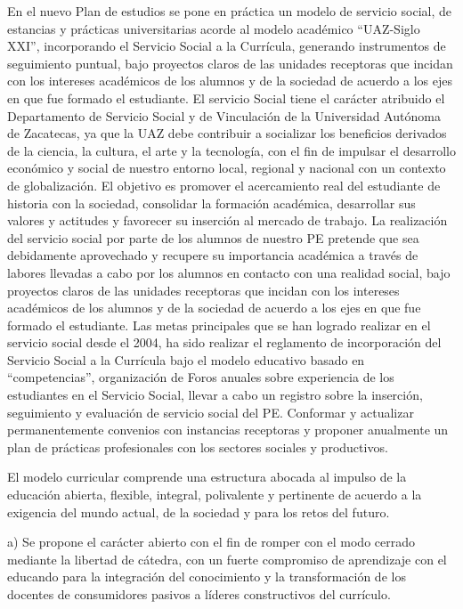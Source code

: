 En el nuevo Plan de estudios  se pone en práctica un modelo de servicio
social, de estancias y prácticas universitarias acorde al modelo académico
“UAZ-Siglo XXI”,  incorporando el Servicio Social a la Currícula, generando
instrumentos de seguimiento puntual, bajo proyectos claros de las unidades
receptoras que incidan con los intereses académicos de los alumnos y de la
sociedad de acuerdo a los ejes en que fue formado el estudiante.  El
servicio Social tiene el carácter atribuido el Departamento de Servicio
Social y de Vinculación de la Universidad Autónoma de Zacatecas, ya que la
UAZ debe contribuir a socializar los beneficios derivados de la ciencia, la
cultura, el arte y la tecnología, con el fin de impulsar el desarrollo
económico y social de nuestro entorno local, regional y nacional con un
contexto de globalización. El objetivo es promover el acercamiento real del
estudiante de historia con la sociedad, consolidar la formación académica,
desarrollar sus valores y actitudes y favorecer su inserción al mercado de
trabajo. La realización del servicio social por parte de los alumnos de
nuestro PE pretende que sea debidamente aprovechado y recupere su
importancia académica a través de labores llevadas a cabo por los alumnos
en contacto con una realidad social,  bajo proyectos claros de las unidades
receptoras que incidan con los intereses académicos de los alumnos y de la
sociedad de acuerdo a los ejes en que fue formado el estudiante.  Las metas
principales que se han logrado realizar en el servicio social desde el
2004, ha sido realizar el reglamento de incorporación del Servicio Social a
la Currícula bajo el modelo educativo basado en “competencias”,
organización de Foros anuales sobre experiencia de los estudiantes en el
Servicio Social, llevar a cabo un registro sobre la inserción, seguimiento
y evaluación de servicio social del PE. Conformar y actualizar
permanentemente convenios con instancias receptoras y proponer anualmente
un plan de prácticas profesionales con los sectores sociales y productivos.

El modelo curricular comprende una estructura abocada al impulso de la
educación abierta, flexible, integral, polivalente y pertinente de acuerdo
a la exigencia del mundo actual, de la sociedad y para los retos del
futuro. 


a) Se propone el carácter abierto con el fin de romper con el modo cerrado
mediante la libertad de cátedra, con un fuerte compromiso de aprendizaje
con el educando para la integración del conocimiento y la transformación de
los docentes de consumidores pasivos a líderes constructivos del currículo.
 


